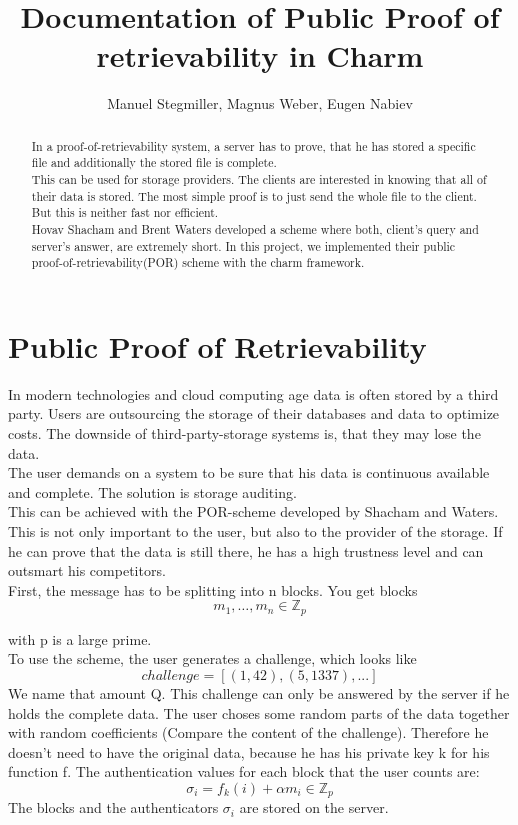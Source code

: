 \documentclass{amsart}
\title{Documentation of Public Proof of retrievability in Charm}
\author{Manuel Stegmiller, Magnus Weber, Eugen Nabiev}
\begin{document}
\begin{abstract}
In a proof-of-retrievability system, a server has to prove, that he has stored a specific file and additionally the stored file is complete.\\
This can be used for storage providers. The clients are interested in knowing that all of their data is stored. The most simple proof is to just send the whole file to the client. But this is neither fast nor efficient.\\
Hovav Shacham and Brent Waters developed a scheme where both, client's query and server's answer, are extremely short. In this project, we implemented their public proof-of-retrievability(POR) scheme with the charm framework.
\end{abstract}
\maketitle
\section{Public Proof of Retrievability}
In modern technologies and cloud computing age data is often stored by a third party. Users are outsourcing the storage of their databases and data to optimize costs. The downside of third-party-storage systems is, that they may lose the data.\\
The user demands on a system to be sure that his data is continuous available and complete. The solution is storage auditing.\\
This can be achieved with the POR-scheme developed by Shacham and Waters. This is not only important to the user, but also to the provider of the storage. If he can prove that the data is still there, he has a high trustness level and can outsmart his competitors.
\\
First, the message has to be splitting into n blocks. You get blocks 
\begin{equation}
 m_{1}, \dots , m_{n} \in \mathbb{Z}_{p}
\end{equation}

with p is a large prime.\\

To use the scheme, the user generates a challenge, which looks like \\
\begin{equation}
challenge = [(1, 42), (5,1337),...]
\end{equation}
We name that amount Q. This challenge can only be answered by the server if he holds the complete data. The user choses some random parts of the data together with random coefficients (Compare the content of the challenge). Therefore he doesn't need to have the original data, because he has his private key k for his function f. The authentication values for each block that the user counts are:\\
\begin{equation}
\sigma_{i} = f_{k}(i) + \alpha m_{i} \in \mathbb{Z}_{p}
\end{equation}
The blocks and the authenticators $ \sigma_{i} $ are stored on the server. \\
\end{document}
